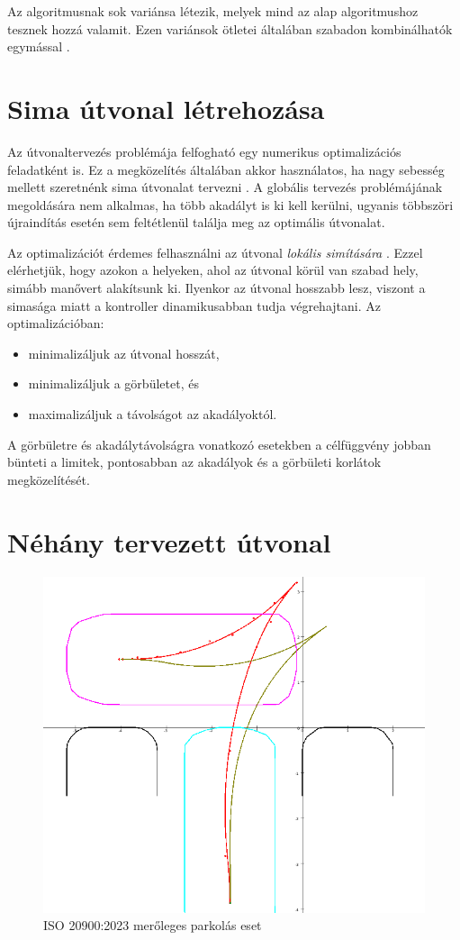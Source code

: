 \documentclass{article}
\begin{document}
Az algoritmusnak sok variánsa létezik, melyek mind az alap algoritmushoz tesznek hozzá valamit. Ezen variánsok ötletei általában szabadon kombinálhatók egymással \cite{jiang2021analysisIDAStar, reinefeld2002enhancedIDAStar, ammar2024enhancedRelaxedAStar, whangbo2007efficientBidirectionalAStar, koenig2005fastReplanningDStarLite}.

\section{Sima útvonal létrehozása}

Az útvonaltervezés problémája felfogható egy numerikus optimalizációs feladatként is. Ez a megközelítés általában akkor használatos, ha nagy sebesség mellett szeretnénk sima útvonalat tervezni \cite{gonzalez2015review}. A globális tervezés problémájának megoldására nem alkalmas, ha több akadályt is ki kell kerülni, ugyanis többszöri újraindítás esetén sem feltétlenül találja meg az optimális útvonalat.

Az optimalizációt érdemes felhasználni az útvonal \textit{lokális simítására} \cite{dolgov2008hybridAstar}. Ezzel elérhetjük, hogy azokon a helyeken, ahol az útvonal körül van szabad hely, simább manővert alakítsunk ki. Ilyenkor az útvonal hosszabb lesz, viszont a simasága miatt a kontroller dinamikusabban tudja  végrehajtani. Az optimalizációban:
\begin{itemize}
  \item minimalizáljuk az útvonal hosszát,
  \item minimalizáljuk a görbületet, és
  \item maximalizáljuk a távolságot az akadályoktól.
\end{itemize}
A görbületre és akadálytávolságra vonatkozó esetekben a célfüggvény jobban bünteti a limitek, pontosabban az akadályok és a görbületi korlátok megközelítését.

\section{Néhány tervezett útvonal}

\begin{figure}[ht]
    \centering
    \includegraphics[width=0.5\linewidth]{images/scenes/ISO-cross.png}
    \caption{ISO 20900:2023 merőleges parkolás eset}
    \label{fig:ISO-cross}
\end{figure}
\end{document}
